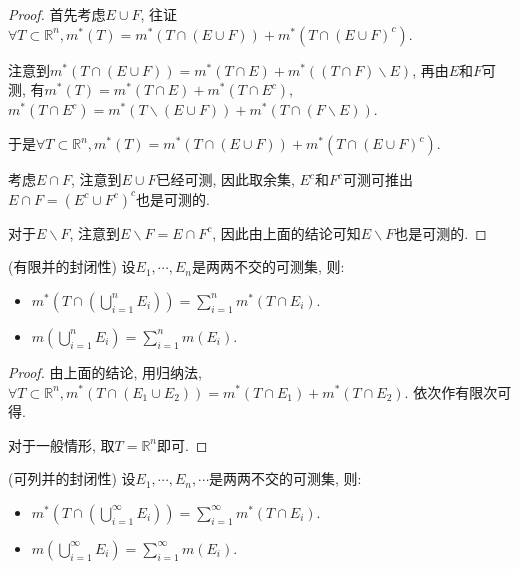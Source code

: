 \documentclass[theorem=false,mathfont=none,openany,sub3section]{easybook}
\begin{document}
\begin{proof}
  首先考虑$E\cup F$, 往证$\forall T\subset \mathbb{R}^n, m^{*}(T)=m^{*}(T\cap (E\cup F))+m^{*}(T\cap (E\cup F)^c)$.\par
  注意到$m^{*}(T\cap (E\cup F))=m^{*}(T\cap E)+m^{*}((T\cap F)\backslash E)$, 再由$E$和$F$可测, 有$m^{*}(T)=m^{*}(T\cap E)+m^{*}(T\cap E^c)$, $m^{*}(T\cap E^c)=m^{*}(T\backslash (E\cup F))+m^{*}(T\cap (F\backslash E))$.\par
  于是$\forall T\subset \mathbb{R}^n, m^{*}(T)=m^{*}(T\cap (E\cup F))+m^{*}(T\cap (E\cup F)^c)$.\par
  考虑$E\cap F$, 注意到$E\cup F$已经可测, 因此取余集, $E^c$和$F^c$可测可推出$E\cap F=(E^c\cup F^c)^c$也是可测的.\par
  对于$E\backslash F$, 注意到$E\backslash F=E\cap F^c$, 因此由上面的结论可知$E\backslash F$也是可测的.\par
\end{proof}

\begin{corollary}
  (有限并的封闭性) 设$E_1,\cdots, E_n$是两两不交的可测集, 则:\par
  \begin{itemize}
    \item $m^{*}(T\cap (\bigcup_{i=1}^{n}E_i))=\sum_{i=1}^{n}m^{*}(T\cap E_i)$.
    \item $m(\bigcup_{i=1}^{n}E_i)=\sum_{i=1}^{n}m(E_i)$.
  \end{itemize}
\end{corollary}

\begin{proof}
  由上面的结论, 用归纳法, $\forall T\subset \mathbb{R}^n, m^{*}(T\cap (E_1 \cup E_2))=m^{*}(T\cap E_1)+m^{*}(T\cap E_2)$. 依次作有限次可得.\par
  对于一般情形, 取$T=\mathbb{R}^n$即可.\par
\end{proof}

\begin{corollary}
  (可列并的封闭性) 设$E_1,\cdots, E_n,\cdots $是两两不交的可测集, 则:\par
  \begin{itemize}
    \item $m^{*}(T\cap (\bigcup_{i=1}^{\infty}E_i))=\sum_{i=1}^{\infty}m^{*}(T\cap E_i)$.
    \item $m(\bigcup_{i=1}^{\infty}E_i)=\sum_{i=1}^{\infty}m(E_i)$.
  \end{itemize}
\end{corollary}
\end{document}

